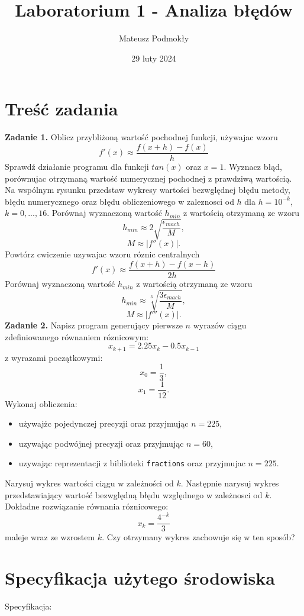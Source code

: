 \documentclass[11pt]{scrartcl}
\title{Laboratorium 1 - Analiza błędów}
\author{Mateusz Podmokły}
\date{29 luty 2024}
\begin{document}
    \maketitle
    \section{Treść zadania}
    \textbf{Zadanie 1.} Oblicz przybliżoną wartość pochodnej funkcji,
    używajac wzoru
    \[
        f'(x) \approx \frac{f(x+h) - f(x)}{h}
    \]
    Sprawdź działanie programu dla funkcji $tan(x)$ oraz $x = 1$.
    Wyznacz błąd, porównujac otrzymaną wartość numerycznej pochodnej
    z prawdziwą wartością. Na wspólnym rysunku przedstaw wykresy
    wartości bezwględnej błędu metody, błędu numerycznego oraz
    błędu obliczeniowego w zaleznosci od $h$ dla $h=10^{-k}$,
    $k = 0,...,16$. Porównaj wyznaczoną wartość $h_{min}$ z wartością
    otrzymaną ze wzoru
    \[
        h_{min} \approx 2\sqrt{\frac{\epsilon_{mach}}{M}},
    \]
    \[
        M \approx \left|f''(x)\right|.
    \]
    Powtórz cwiczenie uzywajac wzoru róznic centralnych
    \[
        f'(x) \approx \frac{f(x+h) - f(x-h)}{2h}
    \]
    Porównaj wyznaczoną wartość $h_{min}$ z wartością
    otrzymaną ze wzoru
    \[
        h_{min} \approx \sqrt[3]{\frac{3\epsilon_{mach}}{M}},
    \]
    \[
        M \approx \left|f'''(x)\right|.
    \]
    \textbf{Zadanie 2.} Napisz program generujący pierwsze $n$
    wyrazów ciągu zdefiniowanego równaniem róznicowym:
    \[
        x_{k+1}=2.25x_k-0.5x_{k-1}
    \]
    z wyrazami początkowymi:
    \[
        x_0=\frac{1}{3},
    \]
    \[
        x_1=\frac{1}{12}.
    \]
    Wykonaj obliczenia:
    \begin{itemize}
        \item używajżc pojedynczej precyzji oraz przyjmując $n = 225$,
        \item uzywając podwójnej precyzji oraz przyjmując $n = 60$,
        \item uzywając reprezentacji z biblioteki \texttt{fractions}
            oraz przyjmujac $n = 225$.
    \end{itemize}
    Narysuj wykres wartości ciągu w zależności od $k$. Następnie
    narysuj wykres przedstawiający wartość bezwględną błędu
    względnego w zależnosci od $k$. \\
    Dokładne rozwiązanie równania róznicowego:
    \[
        x_k=\frac{4^{-k}}{3}
    \]
    maleje wraz ze wzrostem $k$. Czy otrzymany wykres zachowuje
    się w ten sposób?

    \section{Specyfikacja użytego środowiska}
    Specyfikacja:
\end{document}
